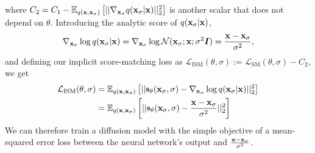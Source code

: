 where $C_2 = C_1 - \mathbb{E}_{q({\mathbf{x}}, {\mathbf{x}}_\sigma)}\left[ || \nabla_{{\mathbf{x}}_\sigma} q({\mathbf{x}}_\sigma|{\mathbf{x}}) ||_2^2 \right]$ is another scalar that does not depend on $\theta$. Introducing the analytic score of $q({\mathbf{x}}_\sigma|{\mathbf{x}})$,
\begin{equation}
    \nabla_{{\mathbf{x}}_\sigma} \log q({\mathbf{x}}_\sigma|{\mathbf{x}}) = \nabla_{{\mathbf{x}}_\sigma} \log {\mathcal{N}}({\mathbf{x}}_\sigma; {\mathbf{x}}; \sigma^2{\bm{I}}) = \frac{{\mathbf{x}}-{\mathbf{x}}_\sigma}{\sigma^2},
\end{equation}
and defining our implicit score-matching loss as $\mathcal{L}_\text{ISM}(\theta, \sigma) := \mathcal{L}_\text{SM}(\theta, \sigma) - C_2$, we get
\begin{align} \label{eq:ism-loss}
    \mathcal{L}_\text{ISM}(\theta, \sigma) &= \mathbb{E}_{q({\mathbf{x}}, {\mathbf{x}}_\sigma)} \left[ 
    || {\mathbf{s}}_\theta({\mathbf{x}}_\sigma, \sigma) - \nabla_{{\mathbf{x}}_\sigma} \log q({\mathbf{x}}_\sigma|{\mathbf{x}}) ||_2^2 \right] \\
    &= \mathbb{E}_{q({\mathbf{x}}, {\mathbf{x}}_\sigma)} \left[  \label{eq:ism-loss-ve}
    || {\mathbf{s}}_\theta({\mathbf{x}}_\sigma, \sigma) - \frac{{\mathbf{x}}-{\mathbf{x}}_\sigma}{\sigma^2} ||_2^2 \right]
\end{align}
We can therefore train a diffusion model with the simple objective of a mean-squared error loss between the neural network's output and $\frac{{\mathbf{x}}-{\mathbf{x}}_\sigma}{\sigma^2}$.

